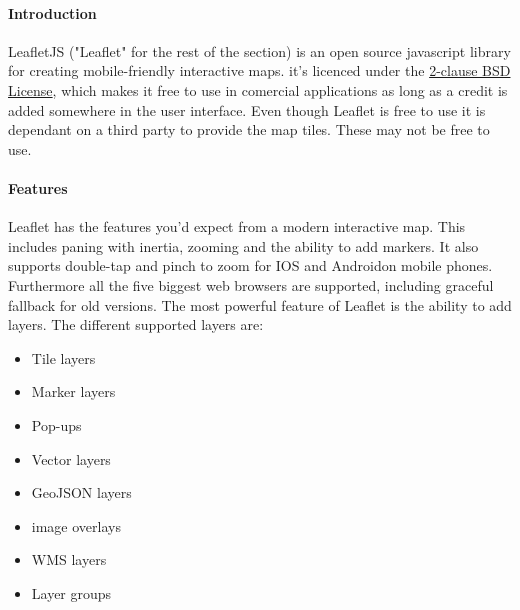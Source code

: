 \documentclass[11pt,a4paper,titlepage,oneside]{report}
\begin{document}
  \paragraph{Introduction} \indent
  LeafletJS ("Leaflet" for the rest of the section) is an open source javascript library for creating mobile-friendly interactive maps. it's licenced under the \href{'https://github.com/Leaflet/Leaflet/blob/master/LICENSE'}{2-clause BSD License}, which makes it free to use in comercial applications as long as a credit is added somewhere in the user interface.
  Even though Leaflet is free to use it is dependant on a third party to provide the map tiles. These may not be free to use.

  \paragraph{Features}
  Leaflet has the features you'd expect from a modern interactive map. This includes paning with inertia, zooming and the ability to add markers. It also supports double-tap and pinch to zoom for IOS and Androidon mobile phones. Furthermore all the five biggest web browsers are supported, including graceful fallback for old versions.
  The most powerful feature of Leaflet is the ability to add layers. 
  \newline The different supported layers are:

  \begin{itemize}
    \item Tile layers
    \item Marker layers
    \item Pop-ups
    \item Vector layers
    \item GeoJSON layers
    \item image overlays
    \item WMS layers
    \item Layer groups
  \end{itemize}
\end{document}
